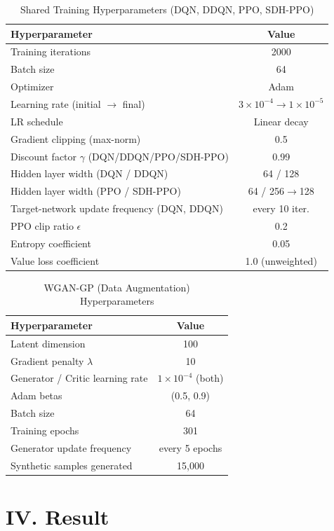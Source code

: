 \documentclass[conference]{IEEEtran}
\begin{document}
\begin{table}[htbp]
\centering
\caption{Shared Training Hyperparameters (DQN, DDQN, PPO, SDH-PPO)}
\label{tab:2}
\begin{tabular}{lc}
\toprule
Hyperparameter & Value \\
\midrule
Training iterations & 2000 \\
Batch size & 64 \\
Optimizer & Adam \\
Learning rate (initial $\to$ final) & $3{\times}10^{-4} \to 1{\times}10^{-5}$ \\
LR schedule & Linear decay \\
Gradient clipping (max-norm) & 0.5 \\
Discount factor $\gamma$ (DQN/DDQN/PPO/SDH-PPO) & 0.99 \\
Hidden layer width (DQN / DDQN) & 64 / 128 \\
Hidden layer width (PPO / SDH-PPO) & 64 / 256$\to$128 \\
Target-network update frequency (DQN, DDQN) & every 10 iter. \\
PPO clip ratio $\epsilon$ & 0.2 \\
Entropy coefficient & 0.05 \\
Value loss coefficient & 1.0 (unweighted) \\
\bottomrule
\end{tabular}
\end{table}

\begin{table}[htbp]
\centering
\caption{WGAN-GP (Data Augmentation) Hyperparameters}
\label{tab:2b}
\begin{tabular}{lc}
\toprule
Hyperparameter & Value \\
\midrule
Latent dimension & 100 \\
Gradient penalty $\lambda$ & 10 \\
Generator / Critic learning rate & $1{\times}10^{-4}$ (both) \\
Adam betas & (0.5, 0.9) \\
Batch size & 64 \\
Training epochs & 301 \\
Generator update frequency & every 5 epochs \\
Synthetic samples generated & 15{,}000 \\
\bottomrule
\end{tabular}
\end{table}

\section{IV. Result}\label{iv.-result}
\end{document}
